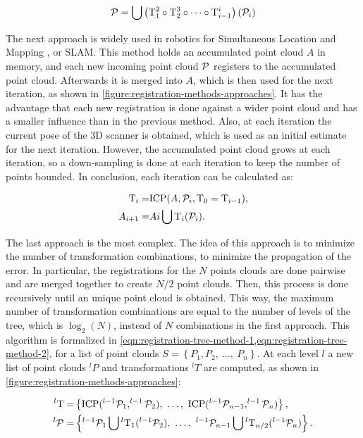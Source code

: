 \begin{equation}
\label{eqn:registration-simple-method-calculation}
    \mathcal{P} = \bigcup{\left(\mathrm{T}_1^2 \circ \mathrm{T}_2^3 \circ \dots \circ \mathrm{T}_{i-1}^i\right)(\mathcal{P}_i)}
\end{equation}

The next approach is widely used in robotics for Simultaneous Location and Mapping , or SLAM. This method holds an accumulated point cloud $A$ in memory, and each new incoming point cloud $\mathcal{P}$ registers to the accumulated point cloud.  Afterwards it is merged into $A$, which is then used for the next iteration, as shown in \cref{figure:registration-methods-approaches}. It has the advantage that each new registration is done against a wider point cloud and has a smaller influence than in the previous method. Also, at each iteration the current pose of the 3D scanner is obtained, which is used as an initial estimate for the next iteration. However, the accumulated point cloud grows at each iteration, so a down-sampling is done at each iteration to keep the number of points bounded. In conclusion, each iteration can be calculated as:

\begin{align}
    \label{eqn:icp-compose-1}
    \mathrm{T}_{i} = & \textrm{ICP}(A, \mathcal{P}_{i}, \mathrm{T}_0 = \mathrm{T}_{i-1}), \\
    \label{eqn:icp-compose-2}
    A_{i+1} = & A{i} \bigcup \mathrm{T}_{i}(\mathcal{P}_i).
\end{align}

The last approach is the most complex. The idea of this approach is to minimize the number of transformation combinations, to minimize the propagation of the error. In particular, the registrations for the $N$ points clouds are done pairwise and are merged together to create $N/2$ point clouds. Then, this process is done recursively until an unique point cloud is obtained. This way, the maximum number of transformation combinations are equal to the number of levels of the tree, which is $\log_2(N)$, instead of $N$ combinations in the first approach. This algorithm is formalized in \cref{eqn:registration-tree-method-1,eqn:registration-tree-method-2}, for a list of point clouds $S=\left\{P_1, P_2, \ \dots, \ P_n\right\}$. At each level $l$ a new list of point clouds $^{l}P$ and transformations $^{l}T$ are computed, as shown in \cref{figure:registration-methods-approaches}:

\begin{align}
    ^{l}\T = & \left\{\textrm{ICP}(^{l-1}\Pt_1, ^{l-1}\Pt_2), \ \dots, \ \textrm{ICP}(^{l-1}\Pt_{n-1}, ^{l-1}\Pt_{n}) \right\},
        \label{eqn:registration-tree-method-1} \\
    ^{l}\Pt = & \left\{^{l-1}\Pt_1 \bigcup{^{l}\T_1(^{l-1}\Pt_2}), \ \dots, \ ^{l-1}\Pt_{n-1} \bigcup{^{l}\T_{n/2}(^{l-1}\Pt_n)}\right\}.
        \label{eqn:registration-tree-method-2}
\end{align}

